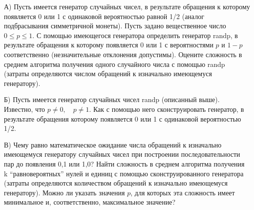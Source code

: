 \begin{comment}
\noindent Пусть элементы матрицы инцидентности -- независимые случайные величины с бернулевским распределением:$P\{ a_{ij} =1\} =p,$ $P\{ a_{ij} =0\} =1-p$. 

\noindent Для решения задачи применяется жадный алгоритм: на каждом шаге выбирается подмножество, максимально покрывающее еще не покрытые объекты. 

Доказать следующее утверждение. Пусть для случайной матрицы $A$, определенной выше, выполнены соотношения:
\[\begin{array}{l} {\forall \gamma >0:} \\ {\frac{\ln n}{m^{\gamma } } \mathop{\to }\limits_{n\to \infty } 0,} \\ {\frac{\ln m}{n} \mathop{\to }\limits_{n\to \infty } 0.} \end{array}\] 
Тогда для $\forall \varepsilon >0:$ $P\left\{\frac{Z}{M} \le 1+\varepsilon \right\}\mathop{\to }\limits_{n\to \infty } 1$, где Z -- решение жадного алгоритма, M -- величина минимального покрытия. 

\begin{fixme}
Добавить указание.
\end{fixme}

\end{problem}

\end{comment}

\begin{problem}
А) Пусть имеется генератор случайных чисел, в 
результате обращения к которому появляется 0 или 1 с одинаковой вероятностью 
равной 1/2 (аналог подбрасывания симметричной монеты). Пусть задано 
вещественное число $0\le p\le 1$. С помощью имеющегося генератора определить 
генератор randp, в результате обращения к которому появляется 0 или 1 с 
вероятностями $p$ и $1-p$ соответственно (незначительные отклонения 
допустимы). Оцените сложность в среднем алгоритма получения одного 
случайного числа с помощью randp (затраты определяются числом обращений к 
изначально имеющемуся генератору). 

Б) Пусть имеется генератор 
случайных чисел randp (описанный выше). Известно, что $p\ne 0,\quad p\ne 1$. 
Как с помощью него сконструировать генератор, в результате обращения 
которому появляется 0 или 1 с одинаковой вероятностью 1/2. 

В) Чему равно математическое ожидание числа обращений к изначально имеющемуся 
генератору случайных чисел при построении последовательности пар до 
появления 0,1 или 1,0? Найти сложность в среднем алгоритма получения k 
``равновероятных'' нулей и единиц с помощью сконструированного генератора 
(затраты определяются количеством обращений к изначально имеющемуся 
генератору). Можно ли указать значения $p$, для которых эта сложность имеет 
минимальное и, соответственно, максимальное значение?
\end{problem}


